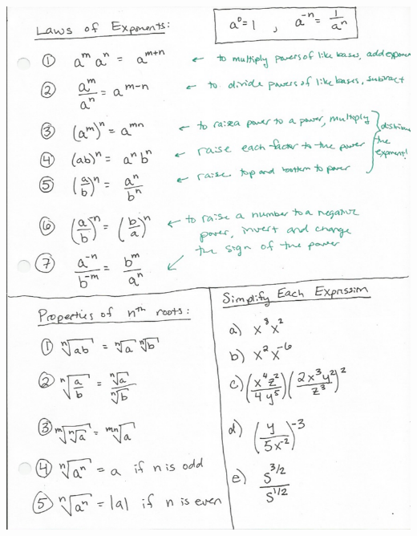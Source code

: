 \documentclass[10pt]{article}
\begin{document}
\hspace*{-.5in}\includegraphics[height=1.1\textheight]{Laws_of_Exponents.pdf}

%


%
%
%
%


%

\label{lastpage}
\end{document}
